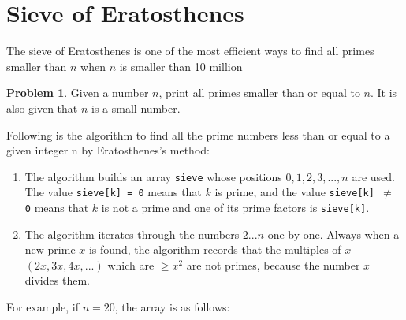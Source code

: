 \documentclass[twoside,12pt,a4paper,english]{book}
\theoremstyle{definition}
\theoremstyle{problemstyle}
\newtheorem*{problem}{Problem} %
\theoremstyle{problemstyle}
\theoremstyle{problemstyle}
\begin{document}
\section{Sieve of Eratosthenes}
The sieve of Eratosthenes is one of the most efficient ways to find all primes smaller than $n$ when $n$ is smaller than 10 million
\begin{problem}
Given a number $n$, print all primes smaller than or equal to $n$. It is also given that $n$ is a small number.
\end{problem}
\begin{tcolorbox}[title=Solution]

Following is the algorithm to find all the prime numbers less than or equal to a given integer n by Eratosthenes's method:
\begin{enumerate}
    \item The algorithm builds an array \texttt{sieve} whose positions $0, 1,2,3,...,n$ are used. The value \texttt{sieve[k] = 0} means that $k$ is prime, and the value \texttt{sieve[k] $\neq$ 0} means that $k$ is not a prime and one of its prime factors is \texttt{sieve[k]}.
    \item The algorithm iterates through the numbers $2...n$ one by one. Always when a new prime $x$ is found, the algorithm records that the multiples of $x$ $(2x,3x,4x,...)$ which are $\geq x^2$ are not primes, because the number $x$ divides them.
\end{enumerate}
For example, if $n=20$, the array is as follows:

\begin{center}
\end{center}
\end{tcolorbox}
\end{document}
